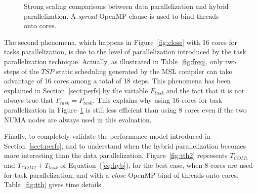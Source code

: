 \begin{figure}[!h]\begin{center}
  \caption{Strong scaling comparisons between data parallelization and hybrid parallelization. A \emph{spread} OpenMP clause is used to bind threads onto cores.}
  \label{fig:spread}
\end{center}\end{figure}

The second phenomena, which happens in Figure~\ref{fig:close} with 16 cores for tasks parallelization, is due to the level of parallelization introduced by the task parallelization technique. Actually, as illustrated in Table~\ref{fig:freq}, only two steps of the $TSP$ static scheduling generated by the MSL compiler can take advantage of 16 cores among a total of 18 steps. This phenomena has been explained in Section~\ref{sect:perfs} by the variable $F_{task}$ and the fact that it is not always true that $F_{task}=P_{task}$. This explains why using 16 cores for task parallelization in Figure~\ref{fig:spread} is still less efficient than using 8 cores even if the two NUMA nodes are always used in this evaluation.

Finally, to completely validate the performance model introduced in Section~\ref{sect:perfs}, and to understand when the hybrid parallelization becomes more interesting than the data parallelization, Figure~\ref{fig:tth2} represents $T_{COM1}$ and $T_{COM2}+T_{task}$ of Equation~(\ref{eq:hyb}), for the best case, \ie when 8 cores are used for task parallelization, and with a \emph{close} OpenMP bind of threads onto cores. Table~\ref{fig:tth} gives time details.

